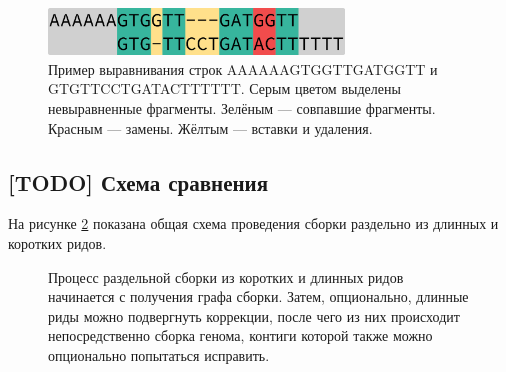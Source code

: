 \documentclass[14pt]{matmex-diploma-custom}
\begin{document}
\begin{figure}[h]
    \centering
    \includegraphics[width=0.7\textwidth]{alignment.eps}
    \caption{Пример выравнивания строк AAAAAAGTGGTTGATGGTT и GTGTTCCTGATACTTTTTT. Серым цветом выделены невыравненные фрагменты. Зелёным --- совпавшие фрагменты. Красным --- замены. Жёлтым --- вставки и удаления. }
    \label{fig:alignment}
\end{figure}

\subsection{[TODO] Схема сравнения}
На рисунке \ref{fig:common_pipeline} показана общая схема проведения сборки раздельно из длинных и коротких ридов.

\begin{figure}[h]
    \centering
{}
\caption{Процесс раздельной сборки из коротких и длинных ридов начинается с получения графа сборки. Затем, опционально, длинные риды можно подвергнуть коррекции, после чего из них происходит непосредственно сборка генома, контиги которой также можно опционально попытаться исправить.}
\label{fig:common_pipeline}
\end{figure}
\end{document}
